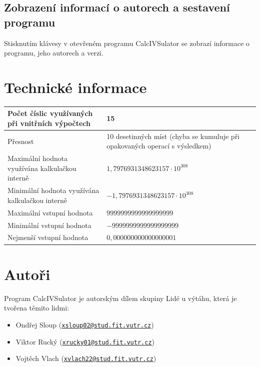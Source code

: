 \documentclass[a5paper,8pt,twoside]{extarticle}
\newcommand{\email}[1]{\texttt{\href{mailto:#1}{#1}}}
\begin{document}
    \subsection{Zobrazení informací o autorech a sestavení programu}
    Stisknutím klávesy  v otevřeném programu CalcIVSulator se zobrazí informace o programu, jeho autorech a verzi.

    \section{Technické informace}

    \begin{table}[h]
    \begin{tabularx}{\textwidth}{|X|X|}
    \hline
    Počet číslic využívaných při vnitřních výpočtech & 15 \\ \hline
    Přesnost & 10 desetinných míst (chyba se kumuluje při opakovaných operací s výsledkem) \\ \hline
    Maximální hodnota využívána kalkulačkou interně& $1,7976931348623157 \cdot 10^{308}$ \\ \hline
    Minimální hodnota využívána kalkulačkou interně & $-1,7976931348623157 \cdot 10^{308}$ \\ \hline
    Maximální vstupní hodnota& $9999999999999999999$ \\ \hline
    Minimální vstupní hodnota& $-9999999999999999999$ \\ \hline
    Nejmenší vstupní hodnota& $0,000000000000000001$ \\ \hline
    \end{tabularx}
    \end{table}

    \section{Autoři}

    Program CalcIVSulator je autorským dílem skupiny Lidé u výtáhu, která je tvořena těmito lidmi:

    \begin{itemize}
        \item Ondřej Sloup (\email{xsloup02@stud.fit.vutr.cz})
        \item Viktor Rucký (\email{xrucky01@stud.fit.vutr.cz})
        \item Vojtěch Vlach (\email{xvlach22@stud.fit.vutr.cz})
    \end{itemize}
\end{document}
